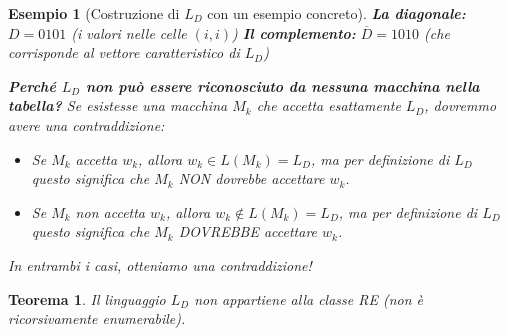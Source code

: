 \documentclass[a4paper]{article}
\newtheorem{theorem}{Teorema}
\newtheorem{example}{Esempio}
\theoremstyle{remark} %
\begin{document}
\begin{example}[Costruzione di $L_D$ con un esempio concreto]
\textbf{La diagonale:} $D = 0101$ (i valori nelle celle $(i,i)$)
\textbf{Il complemento:} $\overline{D} = 1010$ (che corrisponde al vettore caratteristico di $L_D$)

\textbf{Perché $L_D$ non può essere riconosciuto da nessuna macchina nella tabella?}
Se esistesse una macchina $M_k$ che accetta esattamente $L_D$, dovremmo avere una contraddizione:
\begin{itemize}
    \item Se $M_k$ accetta $w_k$, allora $w_k \in L(M_k) = L_D$, ma per definizione di $L_D$ questo significa che $M_k$ NON dovrebbe accettare $w_k$.
    \item Se $M_k$ non accetta $w_k$, allora $w_k \notin L(M_k) = L_D$, ma per definizione di $L_D$ questo significa che $M_k$ DOVREBBE accettare $w_k$.
\end{itemize}
In entrambi i casi, otteniamo una contraddizione!
\end{example}

\begin{theorem}
Il linguaggio $L_D$ non appartiene alla classe RE (non è ricorsivamente enumerabile).
\end{theorem}
\end{document}
